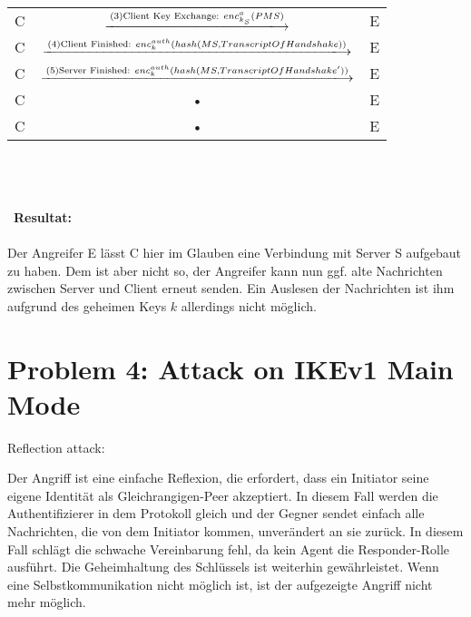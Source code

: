 \documentclass[12pt,pdftex,a4paper]{article}
\begin{document}
\begin{sidewaystable}[ph!]
\begin{tabular}{|c|c|c|}
		C &  $\xlongrightarrow{\text{(3)Client Key Exchange: } enc^{a}_{k_{S}}(PMS)}$  & E \\ 
		
		C &  $\xlongrightarrow{\text{(4)Client Finished: } enc_{k}^{auth}(hash(MS, TranscriptOfHandshake))}$  & E  \\ 
		
		C &  $\xlongrightarrow{\text{(5)Server Finished: } enc_{k}^{auth}(hash(MS, TranscriptOfHandshake'))}$ & E  \\ 
		C & • & E  \\ 
		C & • & E \\ 
\end{tabular} \\\\\\\
\textbf{Resultat:}\\\
\\
Der Angreifer E lässt C hier im Glauben eine Verbindung mit Server S aufgebaut zu haben. Dem ist aber nicht so, der Angreifer kann nun ggf. alte Nachrichten zwischen Server und Client erneut senden. Ein Auslesen der Nachrichten ist ihm aufgrund des geheimen Keys $k$ allerdings nicht möglich.
\end{sidewaystable}
\clearpage

\section*{Problem 4: Attack on IKEv1 Main Mode}
Reflection attack:

Der Angriff ist eine einfache Reflexion, die erfordert, dass ein Initiator seine eigene Identität als Gleichrangigen-Peer akzeptiert. In diesem Fall werden die Authentifizierer in dem Protokoll gleich und der Gegner sendet einfach alle Nachrichten, die von dem Initiator kommen, unverändert an sie zurück. In diesem Fall schlägt die schwache Vereinbarung fehl, da kein Agent die Responder-Rolle ausführt. Die Geheimhaltung des Schlüssels ist weiterhin gewährleistet. Wenn eine Selbstkommunikation nicht möglich ist, ist der aufgezeigte Angriff nicht mehr möglich.
\end{document}
